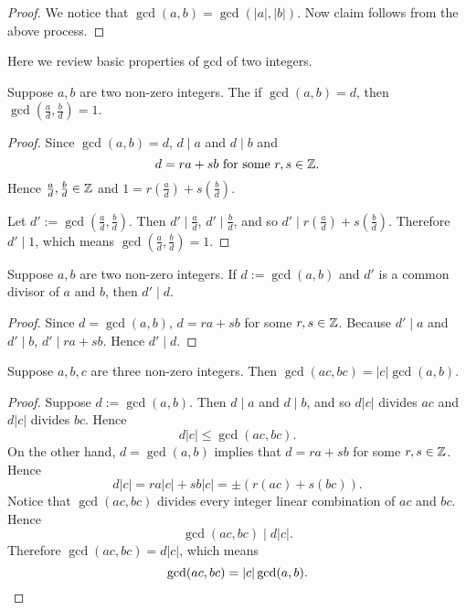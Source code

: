 \begin{proof}
    We notice that $\gcd(a,b)=\gcd(|a|,|b|)$. Now claim
    follows from the above process.
\end{proof}

Here we review basic properties of gcd of two integers.

\begin{theorem}
    Suppose $a,b$ are two non-zero integers. The if $\gcd(a,b)=d$,
    then $\gcd\left(\frac{a}{d},\frac{b}{d}\right)=1$.
\end{theorem}

\begin{proof}
    Since $\gcd(a,b)=d$, $d\mid a$ and $d\mid b$ and
    \[d=ra+sb\text{ for some }r,s\in\mathbb{Z}.\]
    Hence $\frac{a}{d},\frac{b}{d}\in\mathbb{Z}$ and $1=r\left(\frac{a}{d}\right)+s\left(\frac{b}{d}\right)$.

    Let $d':=\gcd\left(\frac{a}{d},\frac{b}{d}\right)$. Then $d'\mid\frac{a}{d}$, $d'\mid\frac{b}{d}$,
    and so $d'\mid r\left(\frac{a}{d}\right)+s\left(\frac{b}{d}\right)$. Therefore
    $d'\mid 1$, which means $\gcd\left(\frac{a}{d},\frac{b}{d}\right)=1$.
\end{proof}

\begin{theorem}
    Suppose $a,b$ are two non-zero integers. If $d:=\gcd(a,b)$
    and $d'$ is a common divisor of $a$ and $b$, then $d'\mid d$.
\end{theorem}

\begin{proof}
    Since $d=\gcd(a,b)$, $d=ra+sb$ for some $r,s\in\mathbb{Z}$.
    Because $d'\mid a$ and $d'\mid b$, $d'\mid ra+sb$. Hence $d'\mid d$.
\end{proof}

\begin{theorem}
    Suppose $a,b,c$ are three non-zero integers.
    Then $\gcd(ac,bc)=|c|\gcd(a,b)$.
\end{theorem}

\begin{proof}
    Suppose $d:=\gcd(a,b)$. Then $d\mid a$ and $d\mid b$,
    and so $d|c|$ divides $ac$ and $d|c|$ divides $bc$. Hence
    \[d|c|\leq\gcd(ac,bc).\]
    On the other hand, $d=\gcd(a,b)$ implies that $d=ra+sb$
    for some $r,s\in\mathbb{Z}$. Hence
    \[d|c|=ra|c|+sb|c|=\pm(r(ac)+s(bc)).\]
    Notice that $\gcd(ac,bc)$ divides every integer linear combination
    of $ac$ and $bc$. Hence
    \[\gcd(ac,bc)\mid d|c|.\]
    Therefore $\gcd(ac,bc)=d|c|$, which means
    \[\gcd(ac,bc)=|c|\gcd(a,b).\qedhere\]
\end{proof}

